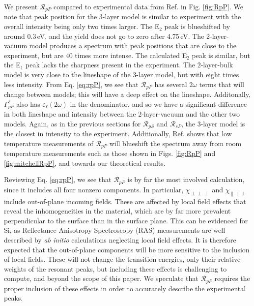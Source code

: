 \documentclass[11pt]{book}
\begin{document}
We present $\mathcal{R}_{pP}$ compared to experimental data from Ref. \cite{mejiaPRB02} in Fig. \ref{fig:RpP}. We note that peak position for the 3-layer model is similar to experiment with the overall intensity being only two times larger. The E$_{2}$ peak is blueshifted by around 0.3\,eV, and the yield does not go to zero after 4.75\,eV. The 2-layer-vacuum model produces a spectrum with peak positions that are close to the experiment, but are 40 times more intense. The calculated E$_{2}$ peak is similar, but the E$_{1}$ peak lacks the sharpness present in the experiment. The 2-layer-bulk model is very close to the lineshape of the 3-layer model, but with eight times less intensity. From Eq. \eqref{eq:rpP}, we see that $\mathcal{R}_{pP}$ has several $2\omega$ terms that will change between models; this will have a deep effect on the lineshape. Additonally, $\Gamma^{\ell}_{pP}$ also has $\varepsilon_{\ell}(2\omega)$ in the denominator, and so we have a significant difference in both lineshape and intensity between the 2-layer-vacuum and the other two models. Again, as in the previous sections for $\mathcal{R}_{pS}$ and $\mathcal{R}_{sP}$, the 3-layer model is the closest in intensity to the experiment. Additionally, Ref. \cite{dadapPRB97} shows that low temperature measurements of $\mathcal{R}_{pP}$ will blueshift the spectrum away from room temperature measurements such as those shown in Figs. \ref{fig:RpP} and \ref{fig:mitchellRpP}, and towards our theoretical results.

Reviewing Eq. \eqref{eq:rpP}, we see that $\mathcal{R}_{pP}$ is by far the most involved calculation, since it includes all four nonzero components. In particular, $\chi_{\perp\perp\perp}$ and $\chi_{\parallel\parallel\perp}$ include out-of-plane incoming fields. These are affected by local field effects\cite{tancognedejean:tel-01235611} that reveal the inhomogeneities in the material, which are by far more prevalent perpendicular to the surface than in the surface plane. This can be evidenced for Si, as Reflectance Anisotropy Spectroscopy (RAS) measurements are well described by \emph{ab initio} calculations neglecting local field effects.\cite{palummoPRB99, gaalPRB09} It is therefore expected that the out-of-plane components will be more sensitive to the inclusion of local fields. These will not change the transition energies, only their relative weights of the resonant peaks,\cite{tancognedejean:tel-01235611} but including these effects is challenging to compute,\cite{nicolasPRB15} and beyond the scope of this paper. We speculate that $\mathcal{R}_{pP}$ requires the proper inclusion of these effects in order to accurately describe the experimental peaks.
\end{document}
